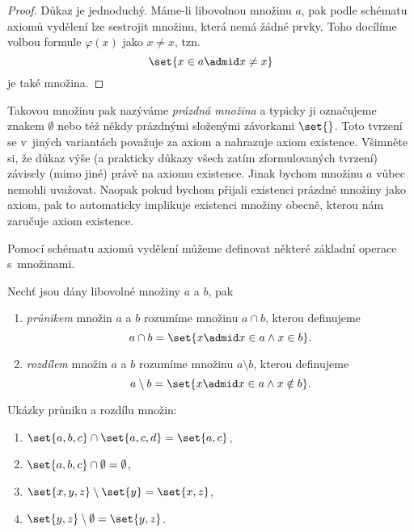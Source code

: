 \begin{proof}
    Důkaz je jednoduchý. Máme-li libovolnou množinu $a$, pak podle schématu axiomů vydělení lze sestrojit množinu, která nemá žádné prvky. Toho docílíme volbou formule $\varphi(x)$ jako $x\neq x$, tzn.
    \begin{equation*}
        \set{x\in a \admid x\neq x}
    \end{equation*}
    je také množina.
\end{proof}
Takovou množinu pak nazýváme \emph{prázdná množina} a typicky ji označujeme znakem $\emptyset$ nebo též někdy prázdnými složenými závorkami $\set{}$. Toto tvrzení se v~jiných variantách \ZF{} považuje za axiom a nahrazuje axiom existence. Všimněte si, že důkaz výše (a prakticky důkazy všech zatím zformulovaných tvrzení) závisely (mimo jiné) právě na axiomu existence. Jinak bychom množinu $a$ vůbec nemohli uvažovat. Naopak pokud bychom přijali existenci prázdné množiny jako axiom, pak to automaticky implikuje existenci množiny obecně, kterou nám zaručuje axiom existence.\par
Pomocí schématu axiomů vydělení můžeme definovat některé základní operace s~množinami.
\begin{definition}\label{def:prunik_rozdil}
    Nechť jsou dány libovolné množiny $a$ a $b$, pak
    \begin{enumerate}[label=(\roman*)]
        \item \emph{průnikem} množin $a$ a $b$ rozumíme množinu $a \cap b$, kterou definujeme
        \begin{equation*}
            a\cap b=\set{x \admid x\in a \land x\in b}.
        \end{equation*}
        \item \emph{rozdílem} množin $a$ a $b$ rozumíme množinu $a \setminus b$, kterou definujeme
        \begin{equation*}
            a\setminus b=\set{x \admid x\in a \land x\notin b}.
        \end{equation*}
    \end{enumerate}
\end{definition}
\begin{example}
    Ukázky průniku a rozdílu množin:
    \begin{enumerate}[label=(\roman*)]
        \item $\set{a,b,c}\cap\set{a,c,d}=\set{a,c}$,
        \item $\set{a,b,c}\cap\emptyset=\emptyset$,
        \item $\set{x,y,z}\setminus\set{y}=\set{x,z}$,
        \item $\set{y,z}\setminus\emptyset=\set{y,z}$.
    \end{enumerate}
\end{example}
